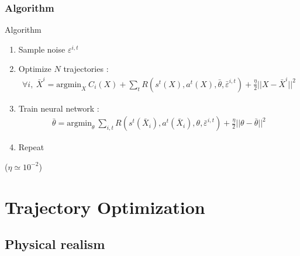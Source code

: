 \documentclass[mathserif]{beamer}
\begin{document}

\begin{frame}
  \frametitle{{Algorithm}}
  \begin{block}{Algorithm}
\begin{enumerate}
\item Sample noise $\varepsilon^{i,t}$
\item Optimize $N$ trajectories : 
\begin{align*}
\forall i, \hspace{3pt} \bar{X}^{i} = \text{argmin}_{X} ~C_{i}(X) + \sum_{t} R(s^t(X),a^t(X),\bar{\theta},\bar{\varepsilon}^{i,t}) + \frac{\eta}{2}||X-\bar{X}^{i}||^2
\end{align*}
\item Train neural network : 
\begin{align*}
\bar{\theta} = \text{argmin}_{\theta} ~\sum_{i,t} R(s^t(\bar{X}_i),a^t(\bar{X}_i),\theta,\bar{\varepsilon}^{i,t}) + \frac{\eta}{2}||\theta-\bar{\theta}||^2
\end{align*}
\item Repeat
\end{enumerate}
  \end{block}
{\small ($\eta \simeq 10^{-2}$)}
\end{frame}




\section{Trajectory Optimization}
\subsection{Physical realism}
\end{document}
